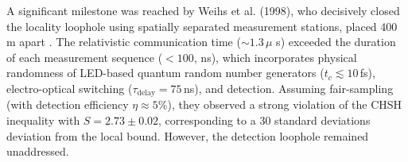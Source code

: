 \documentclass[aps,pra,reprint, superscriptaddress,showkeys]{revtex4-2}
\theoremstyle{plain}
\begin{document}
 A significant milestone was reached by Weihs et al. (1998), who decisively closed the locality loophole using spatially separated measurement stations, placed 400\,m apart \cite{Weihs1998}. The relativistic communication time ($\sim 1.3\,\mu$ s) exceeded the duration of each measurement sequence ($<100$, ns), which incorporates physical randomness of LED-based quantum random number generators ($t_c \lesssim 10$\,fs), electro-optical switching ($\tau_\text{delay} = 75$\,ns), and detection. Assuming fair-sampling (with detection efficiency $\eta \approx 5\%$), they observed a strong violation of the CHSH inequality with $S = 2.73 \pm 0.02$, corresponding to a 30 standard deviations deviation from the local bound. However, the detection loophole remained unaddressed.
\end{document}
